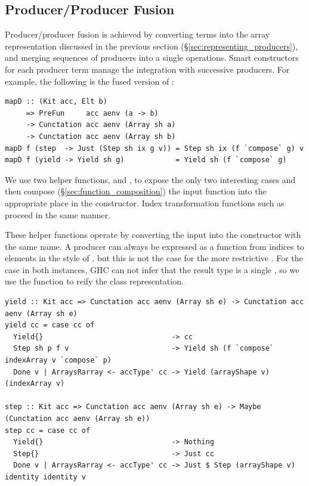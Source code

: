 \subsection{Producer/Producer Fusion}
\label{sec:producer_producer_fusion}

Producer/producer fusion is achieved by converting terms into the array
representation discussed in the previous section
(\S\ref{sec:representing_producers}), and merging sequences of producers into a
single operations. Smart constructors for each producer term manage the
integration with successive producers. For example, the following is the fused
version of :
%
\begin{lstlisting}[style=haskell,
    caption={Fused definition of the \code{map} operation}]
mapD :: (Kit acc, Elt b)
     => PreFun     acc aenv (a -> b)
     -> Cunctation acc aenv (Array sh a)
     -> Cunctation acc aenv (Array sh b)
mapD f (step  -> Just (Step sh ix g v)) = Step sh ix (f `compose` g) v
mapD f (yield -> Yield sh g)            = Yield sh (f `compose` g)
\end{lstlisting}

We use two helper functions,  and , to expose the only
two interesting cases and then compose (\S\ref{sec:function_composition}) the
input function  into the appropriate place in the constructor. Index
transformation functions such as  proceed in the same manner.

These helper functions operate by converting the input  into
the constructor with the same name. A producer can always be expressed as a
function from indices to elements in the style of , but this is not
the case for the more restrictive . For the  case in both
instances, GHC can not infer that the result type is a single , so
we use the  function to reify the  class
representation.
%
\begin{lstlisting}[style=haskell]
yield :: Kit acc => Cunctation acc aenv (Array sh e) -> Cunctation acc aenv (Array sh e)
yield cc = case cc of
  Yield{}                              -> cc
  Step sh p f v                        -> Yield sh (f `compose` indexArray v `compose` p)
  Done v | ArraysRarray <- accType' cc -> Yield (arrayShape v) (indexArray v)

step :: Kit acc => Cunctation acc aenv (Array sh e) -> Maybe (Cunctation acc aenv (Array sh e))
step cc = case cc of
  Yield{}                              -> Nothing
  Step{}                               -> Just cc
  Done v | ArraysRarray <- accType' cc -> Just $ Step (arrayShape v) identity identity v
\end{lstlisting}

